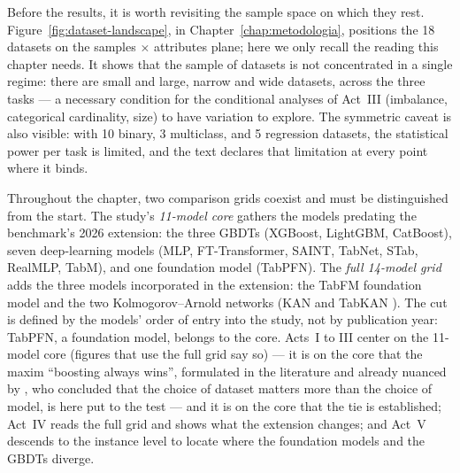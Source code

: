 Before the results, it is worth revisiting the sample space on which
they rest. Figure~\ref{fig:dataset-landscape}, in
Chapter~\ref{chap:metodologia}, positions the 18 datasets on the
samples $\times$ attributes plane; here we only recall the reading
this chapter needs. It shows that the sample of datasets is not
concentrated in a single regime: there are small and large, narrow
and wide datasets, across the three tasks --- a necessary condition
for the conditional analyses of Act~III (imbalance, categorical
cardinality, size) to have variation to explore. The symmetric caveat
is also visible: with 10 binary, 3 multiclass, and 5 regression
datasets, the statistical power per task is limited, and the text
declares that limitation at every point where it binds.

Throughout the chapter, two comparison grids coexist and must be
distinguished from the start. The study's \emph{11-model core}
gathers the models predating the benchmark's 2026 extension: the
three GBDTs (XGBoost, LightGBM, CatBoost), seven deep-learning models
(MLP, FT-Transformer, SAINT, TabNet, STab, RealMLP, TabM), and one
foundation model (TabPFN). The \emph{full 14-model grid} adds the
three models incorporated in the extension: the TabFM foundation
model \citep{tabfm2026,kong2026} and the two Kolmogorov--Arnold
networks (KAN \citep{kan2024} and TabKAN \citep{tabkan2025}). The cut
is defined by the models' order of entry into the study, not by
publication year: TabPFN, a foundation model, belongs to the core.
Acts~I to III center on the 11-model core (figures that use the
full grid say so) --- it is on the core that the
maxim
``boosting always wins'', formulated in the literature
\citep{grinsztajn2022} and
already nuanced by \citet{mcelfresh2023}, who concluded that the
choice of dataset matters more than the choice of model, is here put
to the test --- and it is
on the core that the tie is established; Act~IV reads the full grid and
shows what the extension changes; and Act~V descends to the instance
level to locate where the foundation models and the GBDTs diverge.

